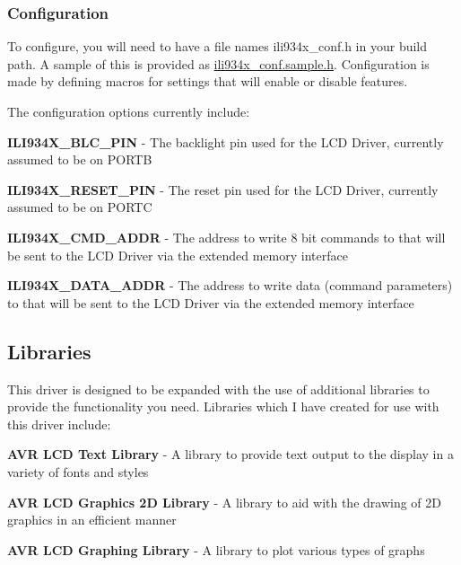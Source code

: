 \subsubsection*{Configuration}

To configure, you will need to have a file names {\ttfamily ili934x\+\_\+conf.\+h} in your build path. A sample of this is provided as {\ttfamily \hyperlink{ili934x__conf_8sample_8h_source}{ili934x\+\_\+conf.\+sample.\+h}}. Configuration is made by defining macros for settings that will enable or disable features.

The configuration options currently include\+:


\begin{DoxyItemize}
\item {\bfseries I\+L\+I934\+X\+\_\+\+B\+L\+C\+\_\+\+P\+I\+N} -\/ The backlight pin used for the L\+C\+D Driver, currently assumed to be on {\ttfamily P\+O\+R\+T\+B}
\item {\bfseries I\+L\+I934\+X\+\_\+\+R\+E\+S\+E\+T\+\_\+\+P\+I\+N} -\/ The reset pin used for the L\+C\+D Driver, currently assumed to be on {\ttfamily P\+O\+R\+T\+C}
\item {\bfseries I\+L\+I934\+X\+\_\+\+C\+M\+D\+\_\+\+A\+D\+D\+R} -\/ The address to write 8 bit commands to that will be sent to the L\+C\+D Driver via the extended memory interface
\item {\bfseries I\+L\+I934\+X\+\_\+\+D\+A\+T\+A\+\_\+\+A\+D\+D\+R} -\/ The address to write data (command parameters) to that will be sent to the L\+C\+D Driver via the extended memory interface
\end{DoxyItemize}

\subsection*{Libraries }

This driver is designed to be expanded with the use of additional libraries to provide the functionality you need. Libraries which I have created for use with this driver include\+:


\begin{DoxyItemize}
\item {\bfseries A\+V\+R L\+C\+D Text Library} -\/ A library to provide text output to the display in a variety of fonts and styles
\item {\bfseries A\+V\+R L\+C\+D Graphics 2\+D Library} -\/ A library to aid with the drawing of 2\+D graphics in an efficient manner
\item {\bfseries A\+V\+R L\+C\+D Graphing Library} -\/ A library to plot various types of graphs
\end{DoxyItemize}

